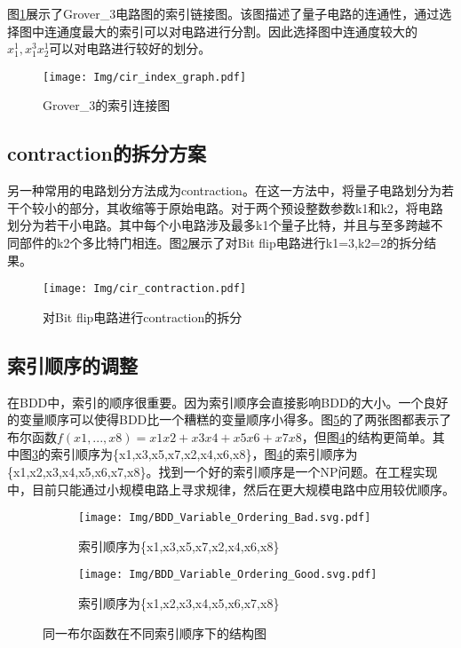 图\ref{fig:addition}展示了Grover\_3电路图的索引链接图。该图描述了量子电路的连通性，通过选择图中连通度最大的索引可以对电路进行分割。因此选择图中连通度较大的$x_1^1,x_1^3x_2^1$可以对电路进行较好的划分。
 
\begin{figure}[!htbp]
	\centering
	\texttt{[image: Img/cir\_index\_graph.pdf]}
	\caption{Grover\_3的索引连接图}
	\label{fig:addition}
\end{figure} 

\subsection*{contraction的拆分方案}
另一种常用的电路划分方法成为contraction。在这一方法中，将量子电路划分为若干个较小的部分，其收缩等于原始电路。对于两个预设整数参数k1和k2，将电路划分为若干小电路。其中每个小电路涉及最多k1个量子比特，并且与至多跨越不同部件的k2个多比特门相连。图\ref{fig:contraction}展示了对Bit flip电路进行k1=3,k2=2的拆分结果。
\begin{figure}[!htbp]
	\centering
	\texttt{[image: Img/cir\_contraction.pdf]}
	\caption{对Bit flip电路进行contraction的拆分}
	\label{fig:contraction}
\end{figure} 


\subsection*{索引顺序的调整}
\label{contraction}在BDD中，索引的顺序很重要。因为索引顺序会直接影响BDD的大小。一个良好的变量顺序可以使得BDD比一个糟糕的变量顺序小得多。图\ref{fig:bdd-compare}的了两张图都表示了布尔函数$f (x1,...,x8)=x1x2+x3x4+x5x6+x7x8$，但图\ref{fig:bdd-good}的结构更简单。其中图\ref{fig:bdd-bad}的索引顺序为\{x1,x3,x5,x7,x2,x4,x6,x8\}，图\ref{fig:bdd-good}的索引顺序为\{x1,x2,x3,x4,x5,x6,x7,x8\}。找到一个好的索引顺序是一个NP问题。在工程实现中，目前只能通过小规模电路上寻求规律，然后在更大规模电路中应用较优顺序。
\begin{figure}[!htbp]
	\centering
	\begin{subfigure}[b]{.4\textwidth}
        \centering
        \texttt{[image: Img/BDD\_Variable\_Ordering\_Bad.svg.pdf]}
		\caption{索引顺序为\{x1,x3,x5,x7,x2,x4,x6,x8\}}
		\label{fig:bdd-bad}
	\end{subfigure}
    \qquad
	\begin{subfigure}[b]{.4\textwidth}
        \centering
        \texttt{[image: Img/BDD\_Variable\_Ordering\_Good.svg.pdf]}
		\caption{索引顺序为\{x1,x2,x3,x4,x5,x6,x7,x8\}}
		\label{fig:bdd-good}
	\end{subfigure}
	\caption{同一布尔函数在不同索引顺序下的结构图\citep{wiki:bdd}}
	\label{fig:bdd-compare}
\end{figure}


